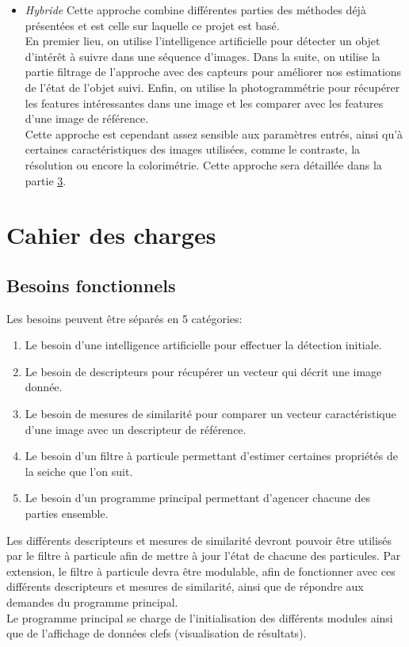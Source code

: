 \begin{itemize}
	\item \textit{Hybride}\newline
	Cette approche combine différentes parties des méthodes déjà présentées et est celle sur laquelle ce projet est basé.\\
	En premier lieu, on utilise l'intelligence artificielle pour détecter un objet d'intérêt à suivre dans une séquence d'images. Dans la suite, on utilise la partie filtrage de l'approche avec des capteurs pour améliorer nos estimations de l'état de l'objet suivi. Enfin, on utilise la photogrammétrie pour récupérer les features intéressantes dans une image et les comparer avec les features d'une image de référence.\\
	Cette approche est cependant assez sensible aux paramètres entrés, ainsi qu'à certaines caractéristiques des images utilisées, comme le contraste, la résolution ou encore la colorimétrie.
	Cette approche sera détaillée dans la partie \hyperlink{chapter.3}{3}.\\
\end{itemize}





\section{Cahier des charges}

\subsection{Besoins fonctionnels}
Les besoins peuvent être séparés en 5 catégories:
\begin{enumerate}
	\item Le besoin d'une intelligence artificielle pour effectuer la détection initiale.
	\item Le besoin de descripteurs pour récupérer un vecteur qui décrit une image donnée.
	\item Le besoin de mesures de similarité pour comparer un vecteur caractéristique d'une image avec un descripteur de référence.
	\item Le besoin d'un filtre à particule permettant d'estimer certaines propriétés de la seiche que l'on suit.
	\item Le besoin d'un programme principal permettant d'agencer chacune des parties ensemble.\\
\end{enumerate}

Les différents descripteurs et mesures de similarité devront pouvoir être utilisés par le filtre à particule afin de mettre à jour l'état de chacune des particules. Par extension, le filtre à particule devra être modulable, afin de fonctionner avec ces différents descripteurs et mesures de similarité, ainsi que de répondre aux demandes du programme principal.\\
Le programme principal se charge de l'initialisation des différents modules ainsi que de l'affichage de données clefs (visualisation de  résultats).\\

